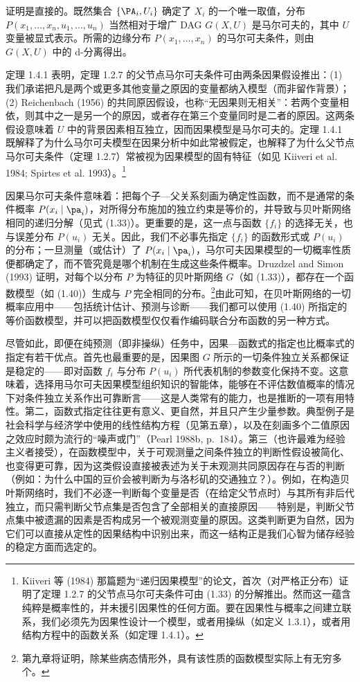证明是直接的。既然集合 $\{\PA_i,U_i\}$ 确定了 $X_i$ 的一个唯一取值，分布 $P(x_1,\dots,x_n,u_1,\dots,u_n)$ 当然相对于增广 DAG $G(X,U)$ 是马尔可夫的，其中 $U$ 变量被显式表示。所需的边缘分布 $P(x_1,\dots,x_n)$ 的马尔可夫条件，则由 $G(X,U)$ 中的 d-分离得出。

定理 1.4.1 表明，定理 1.2.7 的父节点马尔可夫条件可由两条因果假设推出：(1) 我们承诺把凡是两个或更多其他变量之原因的变量都纳入模型（而非留作背景）；(2) Reichenbach (1956) 的共同原因假设，也称“无因果则无相关”：若两个变量相依，则其中之一是另一个的原因，或者存在第三个变量同时是二者的原因。这两条假设意味着 $U$ 中的背景因素相互独立，因而因果模型是马尔可夫的。定理 1.4.1 既解释了为什么马尔可夫模型在因果分析中如此常被假定，也解释了为什么父节点马尔可夫条件（定理 1.2.7）常被视为因果模型的固有特征（如见 Kiiveri et al. 1984; Spirtes et al. 1993）。\footnote{Kiiveri 等 (1984) 那篇题为“递归因果模型”的论文，首次（对严格正分布）证明了定理 1.2.7 的父节点马尔可夫条件可由 \textup{(1.33)} 的分解推出。然而这一蕴含纯粹是概率性的，并未援引因果性的任何方面。要在因果性与概率之间建立联系，我们必须先为因果性设计一个模型，或者用操纵（如定义 1.3.1），或者用结构方程中的函数关系（如定理 1.4.1）。}

因果马尔可夫条件意味着：把每个子—父关系刻画为确定性函数，而不是通常的条件概率 $P(x_i\mid\pa_i)$，对所得分布施加的独立约束是等价的，并导致与贝叶斯网络相同的递归分解（见式 \textup{(1.33)}）。更重要的是，这一点与函数 $\{f_i\}$ 的选择无关，也与误差分布 $P(u_i)$ 无关。因此，我们不必事先指定 $\{f_i\}$ 的函数形式或 $P(u_i)$ 的分布；一旦测量（或估计）了 $P(x_i\mid\pa_i)$，马尔可夫因果模型的一切概率性质便都确定了，而不管究竟是哪个机制在生成这些条件概率。Druzdzel and Simon (1993) 证明，对每个以分布 $P$ 为特征的贝叶斯网络 $G$（如 \textup{(1.33)}），都存在一个函数模型（如 \textup{(1.40)}）生成与 $P$ 完全相同的分布。\footnote{第九章将证明，除某些病态情形外，具有该性质的函数模型实际上有无穷多个。}由此可知，在贝叶斯网络的一切概率应用中——包括统计估计、预测与诊断——我们都可以使用 \textup{(1.40)} 所指定的等价函数模型，并可以把函数模型仅仅看作编码联合分布函数的另一种方式。

尽管如此，即便在纯预测（即非操纵）任务中，因果—函数式的指定也比概率式的指定有若干优点。首先也最重要的是，因果图 $G$ 所示的一切条件独立关系都保证是稳定的——即对函数 $f_i$ 与分布 $P(u_i)$ 所代表机制的参数变化保持不变。这意味着，选择用马尔可夫因果模型组织知识的智能体，能够在不评估数值概率的情况下对条件独立关系作出可靠断言——这是人类常有的能力，也是推断的一项有用特性。第二，函数式指定往往更有意义、更自然，并且只产生少量参数。典型例子是社会科学与经济学中使用的线性结构方程（见第五章），以及在刻画多个二值原因之效应时颇为流行的“噪声或门”（Pearl 1988b, p.~184）。第三（也许最难为经验主义者接受），在函数模型中，关于可观测量之间条件独立的判断性假设被简化、也变得更可靠，因为这类假设直接被表述为关于未观测共同原因存在与否的判断（例如：为什么中国的豆价会被判断为与洛杉矶的交通独立？）。例如，在构造贝叶斯网络时，我们不必逐一判断每个变量是否（在给定父节点时）与其所有非后代独立，而只需判断父节点集是否包含了全部相关的直接原因——特别是，判断父节点集中被遗漏的因素是否构成另一个被观测变量的原因。这类判断更为自然，因为它们可以直接从定性的因果结构中识别出来，而这一结构正是我们心智为储存经验的稳定方面而选定的。

